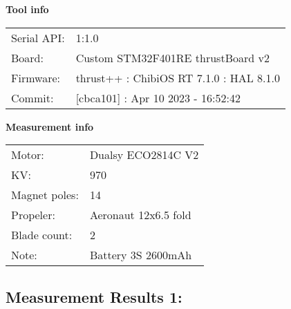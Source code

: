 \documentclass[10pt]{article}
\begin{document}
\noindent
{\large \bf Tool info}
\vspace{3mm}

\noindent
\begin{tabular}{ll}
Serial API:  & 1:1.0\\ 
Board:       & Custom STM32F401RE thrustBoard v2\\ 
Firmware:    & thrust++ : ChibiOS RT 7.1.0 : HAL 8.1.0\\ 
Commit:      & [cbca101] : Apr 10 2023 - 16:52:42
\end{tabular}
\vspace{3mm}

\noindent
{\large \bf Measurement info}
\vspace{3mm}

\noindent
\begin{tabular}{ll}
Motor:        & Dualsy ECO2814C V2\\ 
KV:           & 970\\ 
Magnet poles: & 14\\ 
Propeler:     & Aeronaut 12x6.5 fold\\ 
Blade count:  & 2\\ 
Note:         & Battery 3S 2600mAh
\end{tabular}

\vspace{3mm}


\subsection*{\large \bf Measurement Results 1:}
\end{document}
